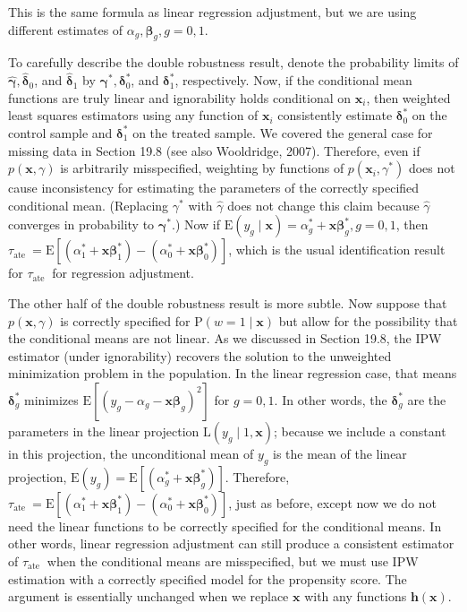 \documentclass[10pt]{article}
\begin{document}
This is the same formula as linear regression adjustment, but we are using different estimates of $\alpha_{g}, \boldsymbol{\beta}_{g}, g=0,1$.

To carefully describe the double robustness result, denote the probability limits of $\hat{\boldsymbol{\gamma}}, \hat{\boldsymbol{\delta}}_{0}$, and $\hat{\boldsymbol{\delta}}_{1}$ by $\boldsymbol{\gamma}^{*}, \boldsymbol{\delta}_{0}^{*}$, and $\boldsymbol{\delta}_{1}^{*}$, respectively. Now, if the conditional mean functions are truly linear and ignorability holds conditional on $\mathbf{x}_{i}$, then weighted least squares estimators using any function of $\mathbf{x}_{i}$ consistently estimate $\boldsymbol{\delta}_{0}^{*}$ on the control sample and $\boldsymbol{\delta}_{1}^{*}$ on the treated sample. We covered the general case for missing data in Section 19.8 (see also Wooldridge, 2007). Therefore, even if $p(\mathbf{x}, \gamma)$ is arbitrarily misspecified, weighting by functions of $p\left(\mathbf{x}_{i}, \gamma^{*}\right)$ does not cause inconsistency for estimating the parameters of the correctly specified conditional mean. (Replacing $\gamma^{*}$ with $\hat{\gamma}$ does not change this claim because $\hat{\gamma}$ converges in probability to $\boldsymbol{\gamma}^{*}$.) Now if $\mathrm{E}\left(y_{g} \mid \mathbf{x}\right)= \alpha_{g}^{*}+\mathbf{x} \boldsymbol{\beta}_{g}^{*}, g=0,1$, then $\tau_{\text {ate }}=\mathrm{E}\left[\left(\alpha_{1}^{*}+\mathbf{x} \boldsymbol{\beta}_{1}^{*}\right)-\left(\alpha_{0}^{*}+\mathbf{x} \boldsymbol{\beta}_{0}^{*}\right)\right]$, which is the usual identification result for $\tau_{\text {ate }}$ for regression adjustment.

The other half of the double robustness result is more subtle. Now suppose that $p(\mathbf{x}, \gamma)$ is correctly specified for $\mathrm{P}(w=1 \mid \mathbf{x})$ but allow for the possibility that the conditional means are not linear. As we discussed in Section 19.8, the IPW estimator (under ignorability) recovers the solution to the unweighted minimization problem in the population. In the linear regression case, that means $\boldsymbol{\delta}_{g}^{*}$ minimizes $\mathrm{E}\left[\left(y_{g}-\alpha_{g}-\mathbf{x} \boldsymbol{\beta}_{g}\right)^{2}\right]$ for $g=0,1$. In other words, the $\boldsymbol{\delta}_{g}^{*}$ are the parameters in the linear projection $\mathrm{L}\left(y_{g} \mid 1, \mathbf{x}\right)$; because we include a constant in this projection, the unconditional mean of $y_{g}$ is the mean of the linear projection, $\mathrm{E}\left(y_{g}\right)=\mathrm{E}\left[\left(\alpha_{g}^{*}+\mathbf{x} \boldsymbol{\beta}_{g}^{*}\right)\right]$. Therefore, $\tau_{\text {ate }}=\mathrm{E}\left[\left(\alpha_{1}^{*}+\mathbf{x} \boldsymbol{\beta}_{1}^{*}\right)-\left(\alpha_{0}^{*}+\mathbf{x} \boldsymbol{\beta}_{0}^{*}\right)\right]$, just as before, except now we do not need the linear functions to be correctly specified for the conditional means. In other words, linear regression adjustment can still produce a consistent estimator of $\tau_{\text {ate }}$ when the conditional means are misspecified, but we must use IPW estimation with a correctly specified model for the propensity score. The argument is essentially unchanged when we replace $\mathbf{x}$ with any functions $\mathbf{h}(\mathbf{x})$.
\end{document}
